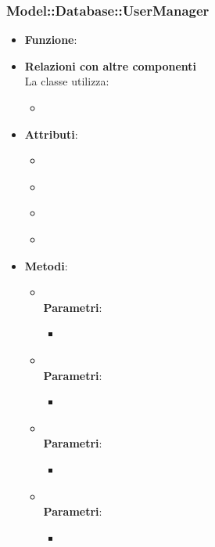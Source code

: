 \subsubsection{Model::Database::UserManager}
\begin{itemize}
\item\textbf{Funzione}:
\item\textbf{Relazioni con altre componenti}\\
La classe utilizza:
	\begin{itemize}
		\item
	\end{itemize}
\item\textbf{Attributi}:
	\begin{itemize}
		\item\code{}\\
		\item\code{}\\
		\item\code{}\\
		\item\code{}\\
	\end{itemize}
\item\textbf{Metodi}:
	\begin{itemize}
		\item\code{}\\
		\textbf{Parametri}:
			\begin{itemize}
				\item\code{}\\
			\end{itemize}
		\item\code{}\\
		\textbf{Parametri}:
			\begin{itemize}
				\item\code{}\\
			\end{itemize}
		\item\code{}\\
		\textbf{Parametri}:
			\begin{itemize}
				\item\code{}\\
			\end{itemize}
		\item\code{}\\
		\textbf{Parametri}:
			\begin{itemize}
				\item\code{}\\
			\end{itemize}
	\end{itemize}
\end{itemize}

